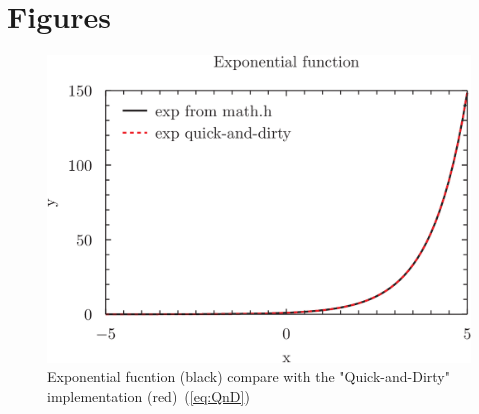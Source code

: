 \documentclass[12pt]{article}
\begin{document}
\section{Figures}
\begin{figure}[h]
  \centering
  \includegraphics{exp.pyxplot.png}
  \caption{Exponential fucntion (black) compare
  with the "Quick-and-Dirty" implementation (red)~(\ref{eq:QnD})}
  \label{fig:EXP_Pyxplot}
\end{figure}
\end{document}
